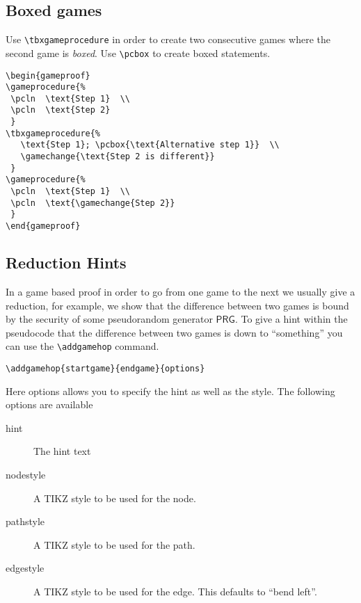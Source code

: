\documentclass[a4paper]{report}
\begin{document}
\subsection{Boxed games}
Use \lstinline$\tbxgameprocedure$ in order to create two consecutive games where the second game is \emph{boxed}. Use
\lstinline$\pcbox$ to create boxed statements.
\begin{center}
\begin{gameproof}
\end{gameproof}
\end{center}

\begin{lstlisting}
\begin{gameproof}
\gameprocedure{%
 \pcln  \text{Step 1}  \\
 \pcln  \text{Step 2}
 }
\tbxgameprocedure{%
   \text{Step 1}; \pcbox{\text{Alternative step 1}}  \\
   \gamechange{\text{Step 2 is different}}
 }
\gameprocedure{%
 \pcln  \text{Step 1}  \\
 \pcln  \text{\gamechange{Step 2}}
 }
\end{gameproof}
\end{lstlisting}

\subsection{Reduction Hints}
In a game based proof in order to go from one game to the next we usually give a reduction, for example, we show that
the difference between two games is bound by the security of some pseudorandom generator $\mathsf{PRG}$. To give a hint
within the pseudocode that the difference between two games is down to ``something'' you can use the \lstinline$\addgamehop$
command.
\begin{lstlisting}
\addgamehop{startgame}{endgame}{options}
\end{lstlisting}
Here options allows you to specify the hint as well as the style. The following options are available
\begin{description}
\item[hint]
The hint text
\item[nodestyle]
A TIKZ style to be used for the node.
\item[pathstyle]
A TIKZ style to be used for the path.
\item[edgestyle]
A TIKZ style to be used for the edge. This defaults to \enquote{bend left}.
\end{description}
\end{document}
